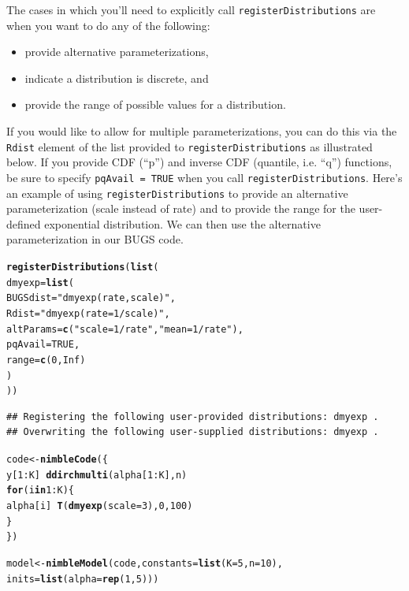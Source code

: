 \documentclass[12pt,oneside]{book}\usepackage[]{graphicx}\usepackage[]{color}
\makeatletter
\newcommand{\hlnum}[1]{\textcolor[rgb]{0.686,0.059,0.569}{#1}}%
\newcommand{\hlstr}[1]{\textcolor[rgb]{0.192,0.494,0.8}{#1}}%
\newcommand{\hlopt}[1]{\textcolor[rgb]{0,0,0}{#1}}%
\newcommand{\hlstd}[1]{\textcolor[rgb]{0.345,0.345,0.345}{#1}}%
\newcommand{\hlkwa}[1]{\textcolor[rgb]{0.161,0.373,0.58}{\textbf{#1}}}%
\newcommand{\hlkwb}[1]{\textcolor[rgb]{0.69,0.353,0.396}{#1}}%
\newcommand{\hlkwc}[1]{\textcolor[rgb]{0.333,0.667,0.333}{#1}}%
\newcommand{\hlkwd}[1]{\textcolor[rgb]{0.737,0.353,0.396}{\textbf{#1}}}%
\newenvironment{kframe}{%
 \def\at@end@of@kframe{}%
 \ifinner\ifhmode%
  \def\at@end@of@kframe{\end{minipage}}%
  \begin{minipage}{\columnwidth}%
 \fi\fi%
 \def\FrameCommand##1{\hskip\@totalleftmargin \hskip-\fboxsep
 \colorbox{shadecolor}{##1}\hskip-\fboxsep
     \hskip-\linewidth \hskip-\@totalleftmargin \hskip\columnwidth}%
 \MakeFramed {\advance\hsize-\width
   \@totalleftmargin\z@ \linewidth\hsize
   \@setminipage}}%
 {\par\unskip\endMakeFramed%
 \at@end@of@kframe}
\newenvironment{knitrout}{}{} %
\def\cd#1{\texttt{#1}}
\makeatother
\begin{document}
The cases in which you'll need to explicitly call
\cd{registerDistributions} are when you want to do any of the following:
\begin{itemize}
  \item provide alternative parameterizations,
    \item indicate a distribution is discrete, and
      \item provide the range of possible values for a distribution.
        \end{itemize}
        
If you would like to allow for
multiple parameterizations, you can do this via the \cd{Rdist} element
of the list provided to \cd{registerDistributions} as illustrated below.  If
you provide CDF (``p'') and inverse CDF (quantile, i.e. ``q'')
functions, be sure to specify \cd{pqAvail = TRUE} when you call
\cd{registerDistributions}.  Here's an example of using \cd{registerDistributions}
to provide an alternative parameterization (scale instead of rate) and to provide the range
for the user-defined exponential distribution. We can then use
the alternative parameterization in our BUGS code.

\begin{knitrout}
\color{fgcolor}\begin{kframe}
\begin{alltt}
\hlkwd{registerDistributions}\hlstd{(}\hlkwd{list}\hlstd{(}
    \hlkwc{dmyexp} \hlstd{=} \hlkwd{list}\hlstd{(}
        \hlkwc{BUGSdist} \hlstd{=} \hlstr{"dmyexp(rate, scale)"}\hlstd{,}
        \hlkwc{Rdist} \hlstd{=} \hlstr{"dmyexp(rate = 1/scale)"}\hlstd{,}
        \hlkwc{altParams} \hlstd{=} \hlkwd{c}\hlstd{(}\hlstr{"scale = 1/rate"}\hlstd{,} \hlstr{"mean = 1/rate"}\hlstd{),}
        \hlkwc{pqAvail} \hlstd{=} \hlnum{TRUE}\hlstd{,}
        \hlkwc{range} \hlstd{=} \hlkwd{c}\hlstd{(}\hlnum{0}\hlstd{,} \hlnum{Inf}\hlstd{)}
        \hlstd{)}
    \hlstd{))}
\end{alltt}
\begin{verbatim}
## Registering the following user-provided distributions: dmyexp .
## Overwriting the following user-supplied distributions: dmyexp .
\end{verbatim}
\begin{alltt}
\hlstd{code} \hlkwb{<-} \hlkwd{nimbleCode}\hlstd{(\{}
     \hlstd{y[}\hlnum{1}\hlopt{:}\hlstd{K]} \hlopt{~} \hlkwd{ddirchmulti}\hlstd{(alpha[}\hlnum{1}\hlopt{:}\hlstd{K], n)}
     \hlkwa{for}\hlstd{(i} \hlkwa{in} \hlnum{1}\hlopt{:}\hlstd{K) \{}
         \hlstd{alpha[i]} \hlopt{~} \hlkwd{T}\hlstd{(}\hlkwd{dmyexp}\hlstd{(}\hlkwc{scale} \hlstd{=} \hlnum{3}\hlstd{),} \hlnum{0}\hlstd{,} \hlnum{100}\hlstd{)}
      \hlstd{\}}
     \hlstd{\})}

\hlstd{model} \hlkwb{<-} \hlkwd{nimbleModel}\hlstd{(code,} \hlkwc{constants} \hlstd{=} \hlkwd{list}\hlstd{(}\hlkwc{K} \hlstd{=} \hlnum{5}\hlstd{,} \hlkwc{n} \hlstd{=} \hlnum{10}\hlstd{),}
                     \hlkwc{inits} \hlstd{=} \hlkwd{list}\hlstd{(}\hlkwc{alpha} \hlstd{=} \hlkwd{rep}\hlstd{(}\hlnum{1}\hlstd{,} \hlnum{5}\hlstd{)))}
\end{alltt}
\end{kframe}
\end{knitrout}
\end{document}
